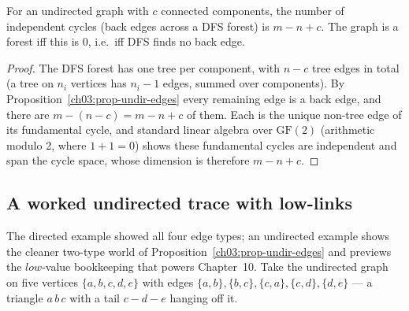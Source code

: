 \begin{corollary}\label{ch03:cor-betti}
For an undirected graph with $c$ connected components, the number of independent cycles (back edges across a DFS forest) is $m-n+c$. The graph is a forest iff this is $0$, i.e.\ iff DFS finds no back edge.
\end{corollary}

\begin{proof}
The DFS forest has one tree per component, with $n-c$ tree edges in total (a tree on $n_i$ vertices has $n_i-1$ edges, summed over components). By Proposition~\ref{ch03:prop-undir-edges} every remaining edge is a back edge, and there are $m-(n-c)=m-n+c$ of them. Each is the unique non-tree edge of its fundamental cycle, and standard linear algebra over $\mathrm{GF}(2)$ (arithmetic modulo 2, where $1+1=0$) shows these fundamental cycles are independent and span the cycle space, whose dimension is therefore $m-n+c$.
\end{proof}

\subsection{A worked undirected trace with low-links}
\label{ch03:undir-trace}

The directed example showed all four edge types; an undirected example shows the cleaner two-type world of Proposition~\ref{ch03:prop-undir-edges} and previews the $\mathit{low}$-value bookkeeping that powers Chapter~10. Take the undirected graph on five vertices $\{a,b,c,d,e\}$ with edges $\{a,b\},\{b,c\},\{c,a\},\{c,d\},\{d,e\}$ --- a triangle $a\,b\,c$ with a tail $c-d-e$ hanging off it.

